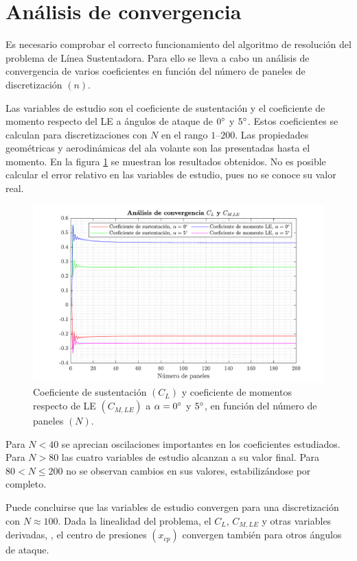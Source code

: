 
\section{Análisis de convergencia}

Es necesario comprobar el correcto funcionamiento del algoritmo de resolución del problema de Línea Sustentadora. Para ello se lleva a cabo un análisis de convergencia de varios coeficientes en función del número de paneles de discretización $\left( n \right)$. 

Las variables de estudio son el coeficiente de sustentación y el coeficiente de momento respecto del LE a ángulos de ataque de $0 \mathrm{^{\circ}}$ y $5 \mathrm{^{\circ}}$. Estos coeficientes se calculan para discretizaciones con $N$ en el rango $1$--$200$. Las propiedades geométricas y aerodinámicas del ala volante son las presentadas hasta el momento. En la figura \ref{fig:convergence_analysis} se muestran los resultados obtenidos. No es posible calcular el error relativo en las variables de estudio, pues no se conoce su valor real.

\begin{figure}[ht]
    \centering
    \includegraphics[width=\linewidth]{imagenes/analisis_convergencia/convergence_analysis.pdf}
    \caption{Coeficiente de sustentación $\left( C_L \right)$ y coeficiente de momentos respecto de LE $\left( C_{M,LE} \right)$ a $\alpha = 0 \mathrm{^{\circ}}$ y $5\mathrm{^{\circ}}$, en función del número de paneles $\left( N \right)$.}
    \label{fig:convergence_analysis}
    \vspace{-4mm}
\end{figure}

Para $N < 40$ se aprecian oscilaciones importantes en los coeficientes estudiados. Para $N > 80$ las cuatro variables de estudio alcanzan a su valor final. Para $80 < N \leq 200$ no se observan cambios en sus valores, estabilizándose por completo. 

Puede concluirse que las variables de estudio convergen para una discretización con $N \approx 100$. Dada la linealidad del problema, el $C_L$, $C_{M,LE}$ y otras variables derivadas, \eg, el centro de presiones $\left( x_{cp} \right)$ convergen también para otros ángulos de ataque. 